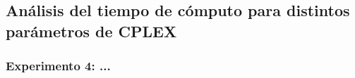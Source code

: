 \documentclass{article}
\begin{document}
\subsection{Análisis del tiempo de cómputo para distintos parámetros de CPLEX}

\subsubsection{Experimento 4: ...}
\end{document}
